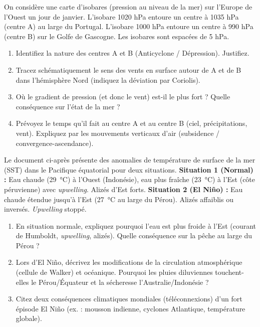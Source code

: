 \documentclass[11pt]{article}
\begin{document}
\begin{exercice}
On considère une carte d'isobares (pression au niveau de la mer) sur l'Europe de l'Ouest un jour de janvier. L'isobare 1020 hPa entoure un centre à 1035 hPa (centre A) au large du Portugal. L'isobare 1000 hPa entoure un centre à 990 hPa (centre B) sur le Golfe de Gascogne. Les isobares sont espacées de 5 hPa.
\begin{enumerate}
    \item Identifiez la nature des centres A et B (Anticyclone / Dépression). Justifiez.
    \item Tracez schématiquement le sens des vents en surface autour de A et de B dans l'hémisphère Nord (indiquez la déviation par Coriolis).
    \item Où le gradient de pression (et donc le vent) est-il le plus fort ? Quelle conséquence sur l'état de la mer ?
    \item Prévoyez le temps qu'il fait au centre A et au centre B (ciel, précipitations, vent). Expliquez par les mouvements verticaux d'air (subsidence / convergence-ascendance).
\end{enumerate}
\end{exercice}

\begin{exercice}
Le document ci-après présente des anomalies de température de surface de la mer (SST) dans le Pacifique équatorial pour deux situations.
\textbf{Situation 1 (Normal) :} Eau chaude (\SI{29}{\celsius}) à l'Ouest (Indonésie), eau plus fraîche (\SI{23}{\celsius}) à l'Est (côte péruvienne) avec \emph{upwelling}. Alizés d'Est forts.
\textbf{Situation 2 (El Niño) :} Eau chaude étendue jusqu'à l'Est (\SI{27}{\celsius} au large du Pérou). Alizés affaiblis ou inversés. \emph{Upwelling} stoppé.
\begin{enumerate}
    \item En situation normale, expliquez pourquoi l'eau est plus froide à l'Est (courant de Humboldt, \emph{upwelling}, alizés). Quelle conséquence sur la pêche au large du Pérou ?
    \item Lors d'El Niño, décrivez les modifications de la circulation atmosphérique (cellule de Walker) et océanique. Pourquoi les pluies diluviennes touchent-elles le Pérou/Équateur et la sécheresse l'Australie/Indonésie ?
    \item Citez deux conséquences climatiques mondiales (téléconnexions) d'un fort épisode El Niño (ex. : mousson indienne, cyclones Atlantique, température globale).
\end{enumerate}
\end{exercice}
\end{document}
